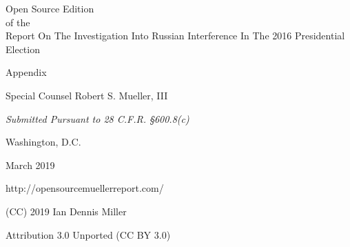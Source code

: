 \thispagestyle{empty}

\begin{center}
\Huge
Open Source Edition \\
of the \\
Report On The Investigation Into Russian Interference In The 2016 Presidential Election

\vspace{10 mm}

\large
Appendix

\vspace{10 mm}

Special Counsel Robert S. Mueller, III

\vspace{10 mm}

\normalsize

\textit{Submitted Pursuant to 28 C.F.R. \S 600.8(c)}

\vspace{20 mm}

Washington, D.C.

\vspace{10 mm}

March 2019

\vspace{10 mm}

\large
http://opensourcemuellerreport.com/

(CC) 2019 Ian Dennis Miller

Attribution 3.0 Unported (CC BY 3.0)

\end{center}

\newpage
